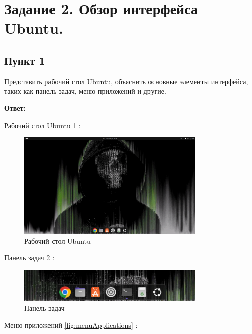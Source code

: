 \section{Задание 2. Обзор интерфейса Ubuntu.}

\subsection{Пункт 1}

Представить рабочий стол Ubuntu, объяснить основные элементы интерфейса, таких как панель задач, меню приложений и другие.

\textbf{Ответ:}

Рабочий стол Ubuntu \ref{fig:desktopUbuntu} :

\begin{figure}[!h]
    \centering
    \includegraphics[width = 0.8\textwidth]{images/desktopUbuntu.png}
    
    \caption{Рабочий стол Ubuntu}
    
    \label{fig:desktopUbuntu}
\end{figure}

Панель задач \ref{fig:taskPanel} :

\begin{figure}[!h]
    \centering
    \includegraphics[width = 0.8\textwidth]{images/taskPanel.png}
    
    \caption{Панель задач}
    
    \label{fig:taskPanel}
\end{figure}

\newpage

Меню приложений \ref{fig:menuApplications} :

